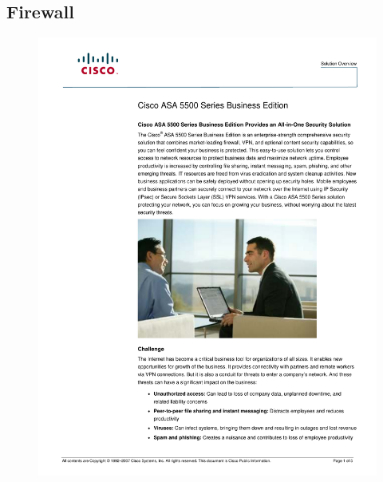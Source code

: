 \documentclass[a4paper, 12pt]{article}
\begin{document}
\subsection{Firewall}
\begin{figure}[H]
\centering
    \includegraphics[scale=0.80]{spec/firewall.pdf}%
    \label{fig:PropProf}
\end{figure}
\end{document}
